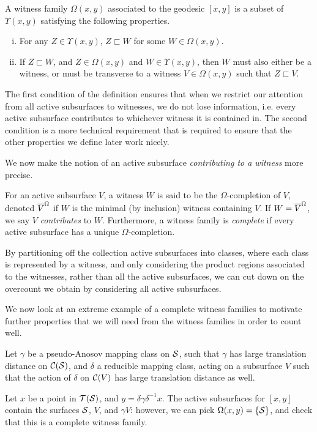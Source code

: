 \documentclass[12pt, reqno]{amsart}
\begin{document}
\begin{definition}
  A witness family $\Omega(x,y)$ associated to the geodesic $[x,y]$ is a subset of $\Upsilon(x, y)$ satisfying the following properties.
  \begin{enumerate}[(i)]
  \item For any $Z \in \Upsilon(x,y)$, $Z \sqsubset W$ for some $W \in \Omega(x,y)$.
  \item If $Z \sqsubset W$, and $Z \in \Omega(x,y)$ and $W \in \Upsilon(x,y)$, then $W$ must also either be a witness, or must be transverse to a witness $V \in \Omega(x,y)$ such that $Z \sqsubset V$.
  \end{enumerate}
\end{definition}
The first condition of the definition ensures that when we restrict our attention from all active subsurfaces to witnesses, we do not lose information, i.e. every active subsurface contributes to whichever witness it is contained in.
The second condition is a more technical requirement that is required to ensure that the other properties we define later work nicely.

We now make the notion of an active subsurface \emph{contributing to a witness} more precise.
\begin{definition}
  For an active subsurface $V$, a witness $W$ is said to be the $\Omega$-completion of $V$, denoted $\overline{V}^{\Omega}$ if $W$ is the minimal (by inclusion) witness containing $V$.
  If $W = \overline{V}^{\Omega}$, we say $V$ \emph{contributes} to $W$.
  Furthermore, a witness family is \emph{complete} if every active subsurface has a unique $\Omega$-completion.
\end{definition}

By partitioning off the collection active subsurfaces into classes, where each class is represented by a witness, and only considering the product regions associated to the witnesses, rather than all the active subsurfaces, we can cut down on the overcount we obtain by considering all active subsurfaces.

We now look at an extreme example of a complete witness families to motivate further properties that we will need from the witness families in order to count well.

\begin{example}
  \label{ex:uninsulated}
  Let $\gamma$ be a pseudo-Anosov mapping class on $\mathcal{S}$, such that $\gamma$ has large translation distance on $\mathcal{C}(\mathcal{S})$, and $\delta$ a reducible mapping class, acting on a subsurface $V$ such that the action of $\delta$ on $\mathcal{C}(V)$ has large translation distance as well.

  Let $x$ be a point in $\mathcal{T}(\mathcal{S})$, and $y = \delta \gamma \delta^{-1} x$.
  The active subsurfaces for $[x, y]$ contain the surfaces $\mathcal{S}$, $V$, and $\gamma V$: however, we can pick $\Omega(x,y) = \left\{ \mathcal{S} \right\}$, and check that this is a complete witness family.
\end{example}
\end{document}
